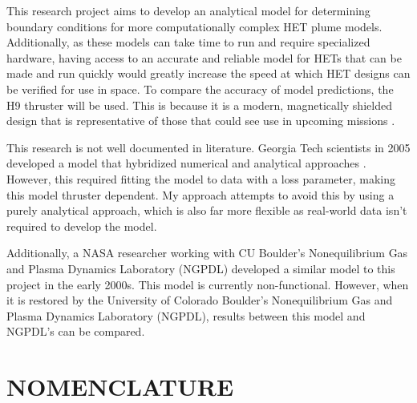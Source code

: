 \documentclass[letterpaper, 10 pt, conference]{ieeeconf}  %
\begin{document}
This research project aims to develop an analytical model for determining boundary conditions for more computationally complex HET plume models. Additionally, as these models can take time to run and require specialized hardware, having access to an accurate and reliable model for HETs that can be made and run quickly would greatly increase the speed at which HET designs can be verified for use in space. To compare the accuracy of model predictions, the H9 thruster will be used. This is because it is a modern, magnetically shielded design that is representative of those that could see use in upcoming missions \cite{c2}.

This research is not well documented in literature. Georgia Tech scientists in 2005 developed a model that hybridized numerical and analytical approaches \cite{c3}. However, this required fitting the model to data with a loss parameter, making this model thruster dependent. My approach attempts to avoid this by using a purely analytical approach, which is also far more flexible as real-world data isn’t required to develop the model.

Additionally, a NASA researcher working with CU Boulder’s Nonequilibrium Gas and Plasma Dynamics Laboratory (NGPDL) developed a similar model to this project in the early 2000s. This model is currently non-functional. However, when it is restored by the University of Colorado Boulder’s Nonequilibrium Gas and Plasma Dynamics Laboratory (NGPDL), results between this model and NGPDL’s can be compared.

\section*{NOMENCLATURE}
\end{document}
